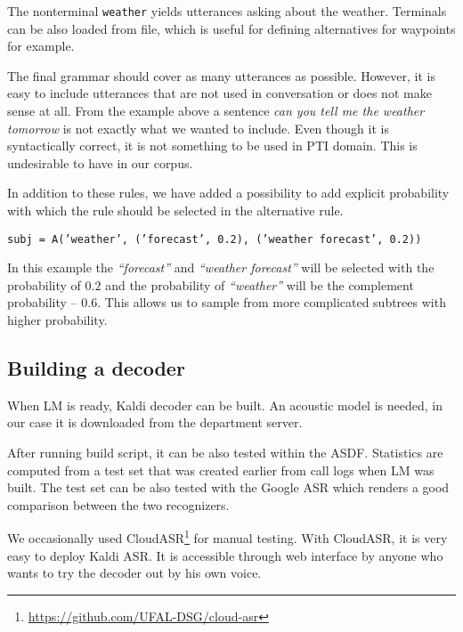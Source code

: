 The nonterminal \texttt{weather} yields utterances asking about the weather.
Terminals can be also loaded from file, which is useful for defining alternatives for waypoints for example.

The final grammar should cover as many utterances as possible.
However, it is easy to include utterances that are not used in conversation or does not make sense at all.
From the example above a sentence \textit{can you tell me the weather tomorrow} is not exactly what we wanted to include.
Even though it is syntactically correct, it is not something to be used in PTI domain.
This is undesirable to have in our corpus.


In addition to these rules, we have added a possibility to add explicit probability with which the rule should be selected in the alternative rule.

\begin{flushleft}
\texttt{subj = A('weather', ('forecast', 0.2), ('weather forecast', 0.2))}
\end{flushleft}

\noindent In this example the \textit{``forecast''} and \textit{``weather forecast''} will be selected with the probability of $0.2$ and the probability of \textit{``weather''} will be the complement probability -- $0.6$.
This allows us to sample from more complicated subtrees with higher probability.

\subsection{Building a decoder}

When LM is ready, Kaldi decoder can be built.
An acoustic model is needed, in our case it is downloaded from the department server.

After running build script, it can be also tested within the ASDF.
Statistics are computed from a test set that was created earlier from call logs when LM was built.
The test set can be also tested with the Google ASR which renders a good comparison between the two recognizers.

We occasionally used CloudASR\footnote{\url{https://github.com/UFAL-DSG/cloud-asr}} for manual testing.
With CloudASR, it is very easy to deploy Kaldi ASR.
It is accessible through web interface by anyone who wants to try the decoder out by his own voice.

